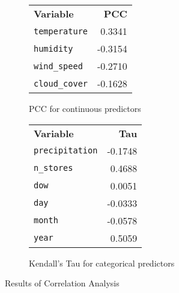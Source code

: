 \begin{figure}[h]
  \centering
  \begin{subfigure}[b]{0.45\textwidth}
    \centering
    \caption{PCC for continuous predictors}
    \label{tab:correlation-numeric}
    \begin{tabular}{@{} >{\arraybackslash}l r @{}}
    \textbf{Variable} & \textbf{PCC} \\ \addlinespace[0.1em]
    \toprule
    \texttt{temperature} & 0.3341 \\
    \texttt{humidity} & -0.3154 \\
    \texttt{wind\_speed} & -0.2710 \\
    \texttt{cloud\_cover} & -0.1628 \\
    \bottomrule
    \end{tabular}
  \end{subfigure}
  \begin{subfigure}[b]{0.45\textwidth}
    \centering
    \caption{Kendall's Tau for categorical predictors}
    \label{tab:correlation-categorical}
    \begin{tabular}{@{} >{\arraybackslash}l r @{}}
    \textbf{Variable} & \textbf{Tau} \\ \addlinespace[0.1em]
    \toprule
    \texttt{precipitation} & -0.1748 \\
    \texttt{n\_stores} & 0.4688 \\
    \texttt{dow} & 0.0051 \\
    \texttt{day} & -0.0333 \\
    \texttt{month} & -0.0578 \\
    \texttt{year} & 0.5059 \\
    \bottomrule
    \end{tabular}
  \end{subfigure}
\caption{Results of Correlation Analysis}
\label{tab:correlations}
\end{figure}

